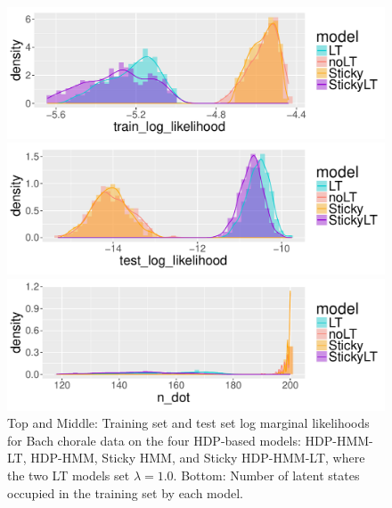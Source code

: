 \begin{figure}[tb]
\begin{center}
  \centerline{\includegraphics[width = 0.75\columnwidth]{fig/music/bach/lambda5/train_log_likelihood_density.pdf}}
  \centerline{\includegraphics[width = 0.75\columnwidth]{fig/music/bach/lambda5/test_log_likelihood_density.pdf}}
  \centerline{\includegraphics[width = 0.75\columnwidth]{fig/music/bach/lambda5/n_dot_density.pdf}}
\caption{Top and Middle: Training set and test set log marginal likelihoods for Bach
  chorale data on the four HDP-based models: HDP-HMM-LT, HDP-HMM,
  Sticky HMM, and Sticky HDP-HMM-LT, where the two LT models set
  $\lambda = 1.0$.  Bottom: Number of latent states
  occupied in the training set by each model. \label{fig:bach-hyperparameter-lambda5p0}
}
\end{center}
\end{figure}

